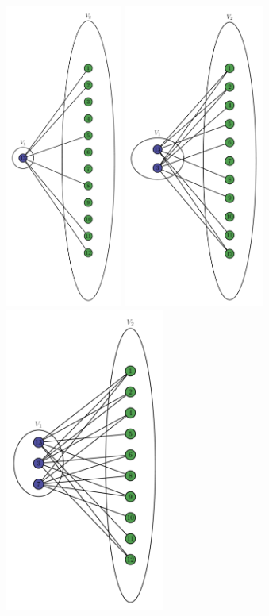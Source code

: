 \includegraphics[height=10cm,width=.24\textwidth]{./exercise1/diagrams/test4.png}
\includegraphics[height=10cm,width=.24\textwidth]{./exercise1/diagrams/test5.png}
\includegraphics[height=10cm,width=.24\textwidth]{./exercise1/diagrams/test6.png}
